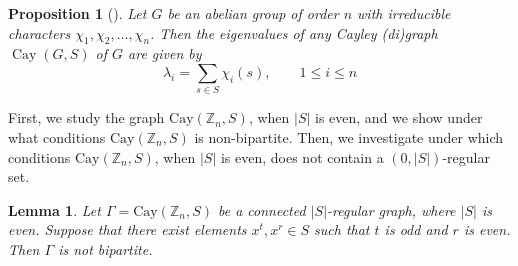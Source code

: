 \documentclass[12pt]{article}
\newtheorem{prop}[formula]{Proposition}
\newtheorem{lem}[formula]{Lemma}
\begin{document}
\begin{prop}[{\cite[Corollary 3]{LZ}}]\label{prop:eigenvalues-abelian}
	Let $G$ be an abelian group of order $n$ with irreducible characters
	$\chi_1, \chi_2, \ldots, \chi_n$. Then the eigenvalues of any Cayley
	(di)graph $ \operatorname{Cay}(G,S)$ of $G$ are given by
	\[
	\lambda_i = \sum_{s \in S} \chi_i(s), \qquad 1 \le i \le n
	\]
\end{prop}
First, we study the graph $\mathrm{Cay}(\mathbb{Z}_n, S)$, when $|S|$ is even, and we show under what conditions $\mathrm{Cay}(\mathbb{Z}_n, S)$ is non-bipartite. Then, we investigate under which conditions $\mathrm{Cay}(\mathbb{Z}_n, S)$, when $|S|$ is even, does not contain a $(0,|S|)$-regular set.
\begin{lem}\label{nonbipartite}
	Let $\Gamma = \mathrm{Cay}(\mathbb{Z}_n, S)$ be a connected $|S|$-regular graph, where $|S|$ is even. Suppose that there exist elements $x^t, x^r \in S$ such that $t$ is odd and $r$ is even. Then $\Gamma$ is not bipartite.
\end{lem}
\end{document}
